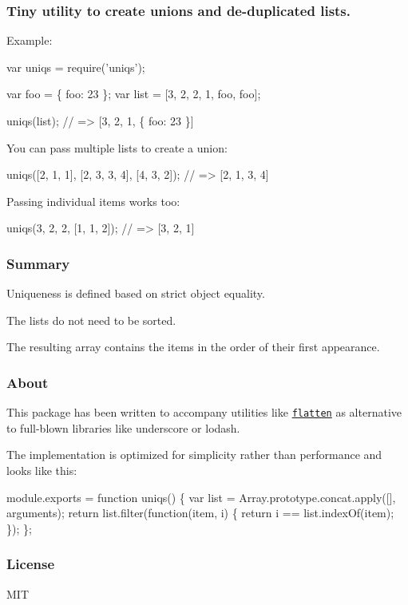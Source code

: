 \href{https://travis-ci.org/fgnass/uniqs}{\tt }

\subsubsection*{Tiny utility to create unions and de-\/duplicated lists.}

Example\+:


\begin{DoxyCode}
var uniqs = require('uniqs');

var foo = \{ foo: 23 \};
var list = [3, 2, 2, 1, foo, foo];

uniqs(list);
// => [3, 2, 1, \{ foo: 23 \}]
\end{DoxyCode}


You can pass multiple lists to create a union\+:


\begin{DoxyCode}
uniqs([2, 1, 1], [2, 3, 3, 4], [4, 3, 2]);
// => [2, 1, 3, 4]
\end{DoxyCode}


Passing individual items works too\+: 
\begin{DoxyCode}
uniqs(3, 2, 2, [1, 1, 2]);
// => [3, 2, 1]
\end{DoxyCode}


\subsubsection*{Summary}


\begin{DoxyItemize}
\item Uniqueness is defined based on strict object equality.
\item The lists do not need to be sorted.
\item The resulting array contains the items in the order of their first appearance.
\end{DoxyItemize}

\subsubsection*{About}

This package has been written to accompany utilities like \href{https://npmjs.org/package/flatten}{\tt flatten} as alternative to full-\/blown libraries like underscore or lodash.

The implementation is optimized for simplicity rather than performance and looks like this\+:


\begin{DoxyCode}
module.exports = function uniqs() \{
  var list = Array.prototype.concat.apply([], arguments);
  return list.filter(function(item, i) \{
    return i == list.indexOf(item);
  \});
\};
\end{DoxyCode}


\subsubsection*{License}

M\+IT 